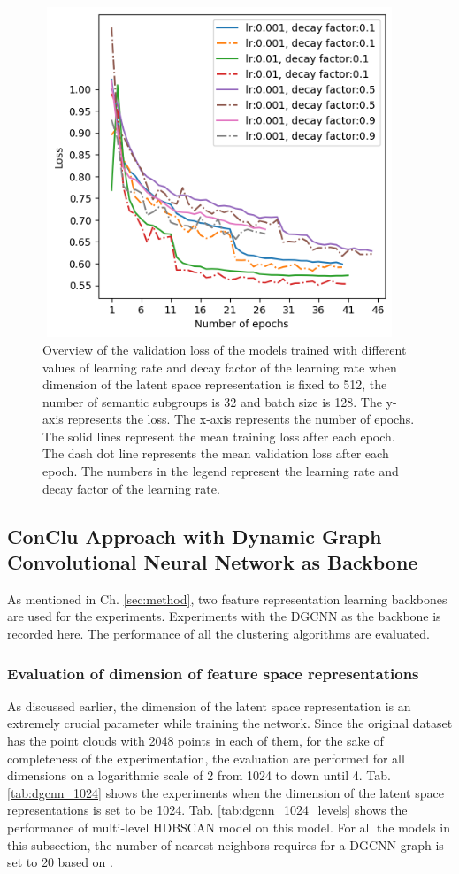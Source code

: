 \begin{figure}[H]
  \centering
  \includegraphics[width=300pt,height=280pt]{pictures/loss_lr.png}
  \caption{Overview of the validation loss of the models trained with different values of learning rate and decay factor of the learning rate when dimension of the latent space representation is fixed to 512, the number of semantic subgroups is 32 and batch size is 128. The y-axis represents the loss. The x-axis represents the number of epochs. The solid lines represent the mean training loss after each epoch. The dash dot line represents the mean validation loss after each epoch. The numbers in the legend represent the learning rate and decay factor of the learning rate.}
  \label{fig:loss_lr}
\end{figure} 

\subsection{ConClu Approach with Dynamic Graph Convolutional Neural Network as Backbone}
\label{sec:conclu_dgcnn}

As mentioned in Ch. \ref{sec:method}, two feature representation learning backbones are used for the experiments. Experiments with the \ac{DGCNN} as the backbone is recorded here. The performance of all the clustering algorithms are evaluated.

\subsubsection{Evaluation of dimension of feature space representations}
As discussed earlier, the dimension of the latent space representation is an extremely crucial parameter while training the network. Since the original dataset has the point clouds with 2048 points in each of them, for the sake of completeness of the experimentation, the evaluation are performed for all dimensions on a logarithmic scale of 2 from 1024 to down until 4. Tab. \ref{tab:dgcnn_1024} shows the experiments when the dimension of the latent space representations is set to be 1024. Tab. \ref{tab:dgcnn_1024_levels} shows the performance of multi-level \ac{HDBSCAN} model on this model. For all the models in this subsection, the number of nearest neighbors requires for a \ac{DGCNN} graph is set to 20 based on \cite{mei2022unsupervised}.

